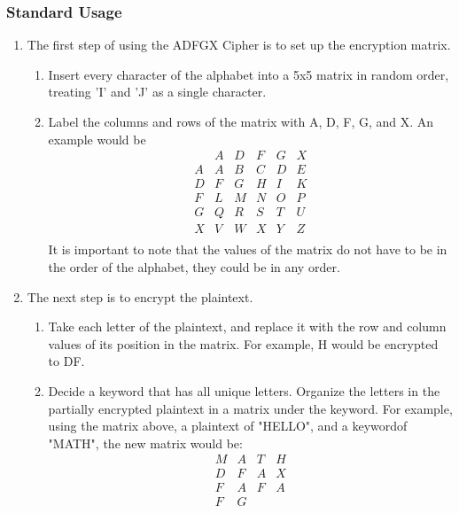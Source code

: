 \documentclass[14pt]{article}
\begin{document}
    	\subsubsection{Standard Usage}
    	\begin{enumerate}
    		\item The first step of using the ADFGX Cipher is to set up the encryption matrix.
    			\begin{enumerate}
    				\item Insert every character of the alphabet into a 5x5 matrix in random order, treating 'I' and 'J' as a single character.
    
    				\item Label the columns and rows of the matrix with A, D, F, G, and X. An example would be
    					\[
    						\begin{array}{c|ccccc}
    							  & A & D & F & G & X \\
    							\hline
    							A & A & B & C & D & E \\
    							D & F & G & H & I & K \\
    							F & L & M & N & O & P \\
    							G & Q & R & S & T & U \\
    							X & V & W & X & Y & Z \\
    						\end{array}
    					\]
    					It is important to note that the values of the matrix do not have to be in the order of the alphabet, they could be in any order.
    			\end{enumerate}
    
    		\item The next step is to encrypt the plaintext.
    			\begin{enumerate}
    				\item Take each letter of the plaintext, and replace it with the row and column values of its position in the matrix. For example, H would be encrypted to DF.
    
    				\item Decide a keyword that has all unique letters. Organize the letters in the partially encrypted plaintext in a matrix under the keyword. For example, using the matrix above, a plaintext of "HELLO", and a keywordof "MATH", the new matrix would be:
    					\[
    						\begin{array}{ccccc}
    							M & A & T & H \\
    							\hline
    							D & F & A & X \\
    							F & A & F & A \\
    							F & G &   &   \\
    						\end{array}
    					\]
    

\end{enumerate}
\end{enumerate}
\end{document}
